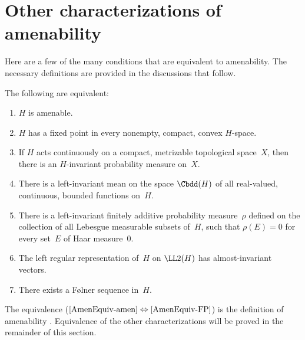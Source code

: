










\section{Other characterizations of amenability}
\label{OtherAmen}

Here are a few of the many conditions that are equivalent to amenability. The necessary definitions are provided in the discussions that follow.

\begin{thm} \label{AmenEquiv}
The following are equivalent:
\noprelistbreak
\begin{enumerate}
\item \label{AmenEquiv-amen}
 $H$ is amenable.
\item \label{AmenEquiv-FP}
 $H$ has a fixed point in every nonempty, compact, convex $H$-space.
\item \label{AmenEquiv-InvMeas}
 If $H$ acts continuously on a compact, metrizable topological space~$X$, then there is an $H$-invariant probability measure on~$X$.
\item \label{AmenEquiv-Mean}
 There is a left-invariant mean on the space $\Cbdd(H)$ of all real-valued, continuous, bounded functions on~$H$.
 \item \label{AmenEquiv-FinAdd}
 There is a left-invariant finitely additive probability measure~$\rho$ defined on the collection of all Lebesgue measurable subsets of~$H$, such that $\rho(E) = 0$ for every set~$E$ of Haar measure~$0$.
\item \label{AmenEquiv-Vectors}
 The left regular representation of~$H$ on $\LL2(H)$ has almost-invariant vectors.
\item \label{AmenEquiv-Folner}
 There exists a F\o lner sequence in~$H$.
\end{enumerate}
\end{thm}

The equivalence ($\ref{AmenEquiv-amen} \Leftrightarrow \ref{AmenEquiv-FP}$) is the definition of amenability . Equivalence of the other characterizations will be proved in the remainder of this section.




